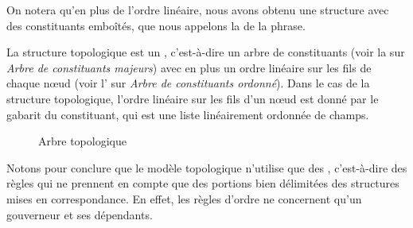On notera qu’en plus de l’ordre linéaire, nous avons obtenu une structure avec des constituants emboîtés, que nous appelons la  de la phrase.

La structure topologique est un , c’est-à-dire un arbre de constituants (voir la  sur \textit{Arbre de constituants majeurs}) avec en plus un ordre linéaire sur les fils de chaque nœud (voir l’ sur \textit{Arbre de constituants ordonné}). Dans le cas de la structure topologique, l’ordre linéaire sur les fils d’un nœud est donné par le gabarit du constituant, qui est une liste linéairement ordonnée de champs.

\begin{figure}

\caption{\label{fig:}Arbre topologique}

\end{figure}

Notons pour conclure que le modèle topologique n’utilise que des , c’est-à-dire des règles qui ne prennent en compte que des portions bien délimitées des structures mises en correspondance. En effet, les règles d’ordre ne concernent qu’un gouverneur et ses dépendants.

